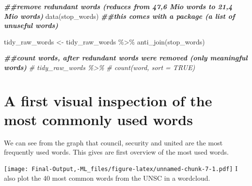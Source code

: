 \documentclass[
]{article}
\newenvironment{Shaded}{\begin{snugshade}}{\end{snugshade}}
\newcommand{\AttributeTok}[1]{\textcolor[rgb]{0.77,0.63,0.00}{#1}}
\newcommand{\CommentTok}[1]{\textcolor[rgb]{0.56,0.35,0.01}{\textit{#1}}}
\newcommand{\DecValTok}[1]{\textcolor[rgb]{0.00,0.00,0.81}{#1}}
\newcommand{\DocumentationTok}[1]{\textcolor[rgb]{0.56,0.35,0.01}{\textbf{\textit{#1}}}}
\newcommand{\FunctionTok}[1]{\textcolor[rgb]{0.00,0.00,0.00}{#1}}
\newcommand{\NormalTok}[1]{#1}
\newcommand{\OtherTok}[1]{\textcolor[rgb]{0.56,0.35,0.01}{#1}}
\newcommand{\SpecialCharTok}[1]{\textcolor[rgb]{0.00,0.00,0.00}{#1}}
\newcommand{\StringTok}[1]{\textcolor[rgb]{0.31,0.60,0.02}{#1}}
\begin{document}
\begin{Shaded}
\begin{Highlighting}[]
\DocumentationTok{\#\#remove redundant words (reduces from 47,6 Mio words to 21,4 Mio words)}
\FunctionTok{data}\NormalTok{(stop\_words)  }\DocumentationTok{\#\#this comes with a package (a list of unuseful words)}

\NormalTok{tidy\_raw\_words }\OtherTok{\textless{}{-}}\NormalTok{ tidy\_raw\_words }\SpecialCharTok{\%\textgreater{}\%}
  \FunctionTok{anti\_join}\NormalTok{(stop\_words)}

\DocumentationTok{\#\#count words, after redundant words were removed (only meaningful words)}
\CommentTok{\# tidy\_raw\_words \%\textgreater{}\%}
\CommentTok{\#   count(word, sort = TRUE)}
\end{Highlighting}
\end{Shaded}

\hypertarget{a-first-visual-inspection-of-the-most-commonly-used-words}{%
\section{A first visual inspection of the most commonly used
words}\label{a-first-visual-inspection-of-the-most-commonly-used-words}}

We can see from the graph that council, security and united are the most
frequently used words. This gives are first overview of the most used
words.

\texttt{[image: Final-Output,-ML\_files/figure-latex/unnamed-chunk-7-1.pdf]}
I also plot the 40 most common words from the UNSC in a wordcloud.

\begin{Shaded}
\end{Shaded}
\end{document}
